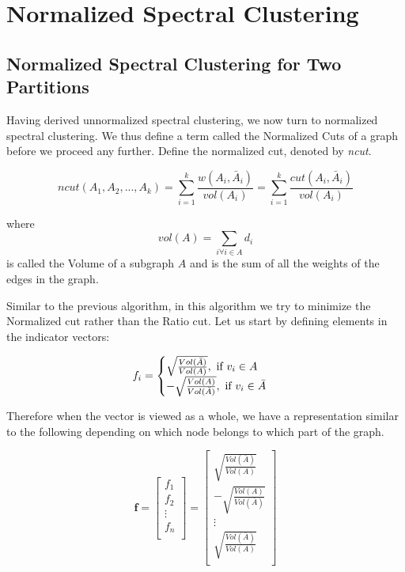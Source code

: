 \documentclass[english]{article}
\theoremstyle{plain}
\begin{document}
\section{Normalized Spectral Clustering}

\subsection{Normalized Spectral Clustering for Two Partitions}

Having derived unnormalized spectral clustering, we now turn to normalized spectral clustering. We thus define a term called the Normalized Cuts of a graph before we proceed any further. Define the normalized cut, denoted by \textit{ncut}.

\begin{equation}
ncut(A_{1},A_{2},...,A_{k}) = \sum_{i=1}^{k} \frac{w(A_{i},\bar{A}_{i})}{vol(A_{i})} = \sum_{i=1}^{k} \frac{cut(A_{i},\bar{A}_{i})}{vol(A_{i})}
\end{equation}

where
\begin{equation}
vol(A) = \sum_{i \forall i \in A} d_{i}
\end{equation}
is called the Volume of a subgraph $A$ and is the sum of all the weights of the edges in the graph.

Similar to the previous algorithm, in this algorithm we try to minimize the Normalized cut rather than the Ratio cut. Let us start by defining elements in the indicator vectors:

\begin{equation}
f_i = \begin{cases}
\sqrt{\frac{Vol(\bar{A})}{Vol(A)}},\textnormal{ if } v_{i} \in A \\
-\sqrt{\frac{Vol(A)}{Vol(\bar{A})}},\textnormal{ if } v_{i} \in \bar{A} \\
\end{cases}
\end{equation}

Therefore when the vector is viewed as a whole, we have a representation similar to the following depending on which node belongs to which part of the graph.

\begin{equation}
\boldsymbol{f} = 
\begin{bmatrix}
f_{1}\\
f_{2}\\
\vdots\\
f_{n}\\
\end{bmatrix} = 
\begin{bmatrix}
\sqrt{\frac{Vol(\bar{A})}{Vol(A)}}  \\
-\sqrt{\frac{Vol(A)}{Vol(\bar{A})}} \\
\vdots\\
\sqrt{\frac{Vol(\bar{A})}{Vol(A)}}\\
\end{bmatrix}
\end{equation}
\end{document}
